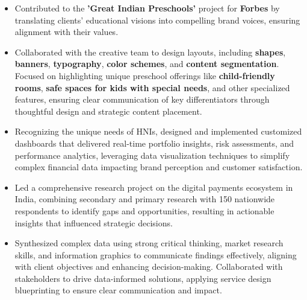 \documentclass[10pt,a4paper,ragged2e,withhyper]{altacv}
\begin{document}
\begin{paracol}{2}
\divider

\begin{itemize}
  \item Contributed to the \textbf{'Great Indian Preschools'} project for \textbf{Forbes} by translating clients' educational visions into compelling brand voices, ensuring alignment with their values.  
  \item Collaborated with the creative team to design layouts, including \textbf{shapes}, \textbf{banners}, \textbf{typography}, \textbf{color schemes}, and \textbf{content segmentation}. Focused on highlighting unique preschool offerings like \textbf{child-friendly rooms}, \textbf{safe spaces for kids with special needs}, and other specialized features, ensuring clear communication of key differentiators through thoughtful design and strategic content placement.
\end{itemize}

\divider

\begin{itemize}
  \item Recognizing the unique needs of HNIs, designed and implemented customized dashboards that delivered real-time portfolio insights, risk assessments, and performance analytics, leveraging data visualization techniques to simplify complex financial data impacting brand perception and customer satisfaction.
\end{itemize}


\divider

\begin{itemize}[left=0pt]
  \item Led a comprehensive research project on the digital payments ecosystem in India, combining secondary and primary research with 150 nationwide respondents to identify gaps and opportunities, resulting in actionable insights that influenced strategic decisions.
  \item Synthesized complex data using strong critical thinking, market research skills, and information graphics to communicate findings effectively, aligning with client objectives and enhancing decision-making. Collaborated with stakeholders to drive data-informed solutions, applying service design blueprinting to ensure clear communication and impact.
\end{itemize}


\end{paracol}
\end{document}
